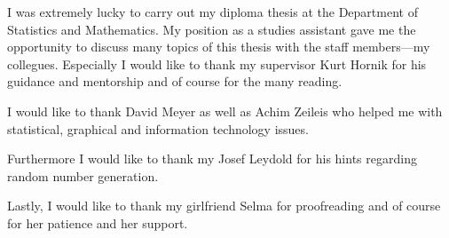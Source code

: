 \begin{acknowledgments}
I was extremely lucky to carry out my diploma thesis at the Department
of Statistics and Mathematics. My position as a studies assistant gave
me the opportunity to discuss many topics of this thesis with
the staff members---my collegues. Especially I would like to thank my
supervisor Kurt Hornik for his guidance and mentorship and of course for
the many reading.

I would like to thank David Meyer as well as
Achim Zeileis who helped me with statistical, graphical and
information technology issues.

Furthermore I would like to thank my Josef Leydold for his hints
regarding random number generation.

Lastly, I would like to thank my girlfriend Selma for proofreading and
of course for her patience and her support.

\end{acknowledgments}